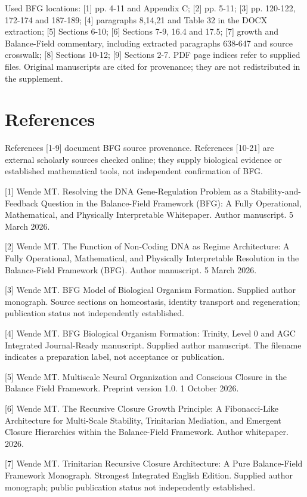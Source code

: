 \documentclass[11pt,a4paper]{article}
\begin{document}
Used BFG locations: [1] pp. 4-11 and Appendix C; [2] pp. 5-11; [3] pp. 120-122, 172-174 and 187-189; [4] paragraphs 8,14,21 and Table 32 in the DOCX extraction; [5] Sections 6-10; [6] Sections 7-9, 16.4 and 17.5; [7] growth and Balance-Field commentary, including extracted paragraphs 638-647 and source crosswalk; [8] Sections 10-12; [9] Sections 2-7. PDF page indices refer to supplied files. Original manuscripts are cited for provenance; they are not redistributed in the supplement.

\clearpage
\section*{References}
References [1-9] document BFG source provenance. References [10-21] are external scholarly sources checked online; they supply biological evidence or established mathematical tools, not independent confirmation of BFG.

[1] Wende MT. Resolving the DNA Gene-Regulation Problem as a Stability-and-Feedback Question in the Balance-Field Framework (BFG): A Fully Operational, Mathematical, and Physically Interpretable Whitepaper. Author manuscript. 5 March 2026.

[2] Wende MT. The Function of Non-Coding DNA as Regime Architecture: A Fully Operational, Mathematical, and Physically Interpretable Resolution in the Balance-Field Framework (BFG). Author manuscript. 5 March 2026.

[3] Wende MT. BFG Model of Biological Organism Formation. Supplied author monograph. Source sections on homeostasis, identity transport and regeneration; publication status not independently established.

[4] Wende MT. BFG Biological Organism Formation: Trinity, Level 0 and AGC Integrated Journal-Ready manuscript. Supplied author manuscript. The filename indicates a preparation label, not acceptance or publication.

[5] Wende MT. Multiscale Neural Organization and Conscious Closure in the Balance Field Framework. Preprint version 1.0. 1 October 2026.

[6] Wende MT. The Recursive Closure Growth Principle: A Fibonacci-Like Architecture for Multi-Scale Stability, Trinitarian Mediation, and Emergent Closure Hierarchies within the Balance-Field Framework. Author whitepaper. 2026.

[7] Wende MT. Trinitarian Recursive Closure Architecture: A Pure Balance-Field Framework Monograph. Strongest Integrated English Edition. Supplied author monograph; public publication status not independently established.
\end{document}

